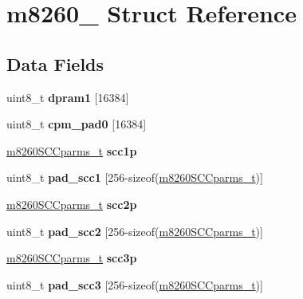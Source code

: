 \hypertarget{structm8260__}{}\section{m8260\+\_\+ Struct Reference}
\label{structm8260__}
\subsection*{Data Fields}
\begin{DoxyCompactItemize}
\item 
\mbox{\label{structm8260___a3898b20a769ea52113ef61ac56138857}} 
uint8\+\_\+t {\bfseries dpram1} \mbox{[}16384\mbox{]}
\item 
\mbox{\label{structm8260___aacbf27f1c4fb69ce427111d01acb3baf}} 
uint8\+\_\+t {\bfseries cpm\+\_\+pad0} \mbox{[}16384\mbox{]}
\item 
\mbox{\label{structm8260___a867efec3e05923fadaa3259fa47bef86}} 
\mbox{\hyperlink{structm8260SCCparms__}{m8260\+S\+C\+Cparms\+\_\+t}} {\bfseries scc1p}
\item 
\mbox{\label{structm8260___a5fab9fbea46684ad69e204afed2444a0}} 
uint8\+\_\+t {\bfseries pad\+\_\+scc1} \mbox{[}256-\/sizeof(\mbox{\hyperlink{structm8260SCCparms__}{m8260\+S\+C\+Cparms\+\_\+t}})\mbox{]}
\item 
\mbox{\label{structm8260___adbedc0ca90767cdb6e9e58dab9ffe91b}} 
\mbox{\hyperlink{structm8260SCCparms__}{m8260\+S\+C\+Cparms\+\_\+t}} {\bfseries scc2p}
\item 
\mbox{\label{structm8260___aca3751e21987d3cdd82da3830cae888a}} 
uint8\+\_\+t {\bfseries pad\+\_\+scc2} \mbox{[}256-\/sizeof(\mbox{\hyperlink{structm8260SCCparms__}{m8260\+S\+C\+Cparms\+\_\+t}})\mbox{]}
\item 
\mbox{\label{structm8260___a0f193eb4cfb83d9e060d571dc194bb53}} 
\mbox{\hyperlink{structm8260SCCparms__}{m8260\+S\+C\+Cparms\+\_\+t}} {\bfseries scc3p}
\item 
\mbox{\label{structm8260___acfe1b4c7a4806c695d82293e7c1216f5}} 
uint8\+\_\+t {\bfseries pad\+\_\+scc3} \mbox{[}256-\/sizeof(\mbox{\hyperlink{structm8260SCCparms__}{m8260\+S\+C\+Cparms\+\_\+t}})\mbox{]}

\end{DoxyCompactItemize}
